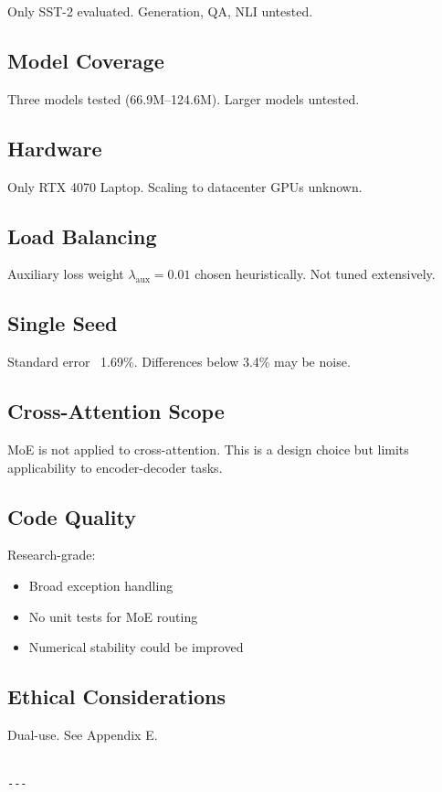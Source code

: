 Only SST-2 evaluated. Generation, QA, NLI untested.

\subsection{Model Coverage}

Three models tested (66.9M--124.6M). Larger models untested.

\subsection{Hardware}

Only RTX 4070 Laptop. Scaling to datacenter GPUs unknown.

\subsection{Load Balancing}

Auxiliary loss weight $\lambda_\text{aux} = 0.01$ chosen 
heuristically. Not tuned extensively.

\subsection{Single Seed}

Standard error ~1.69\%. Differences below 3.4\% may be noise.

\subsection{Cross-Attention Scope}

MoE is not applied to cross-attention. This is a design choice but 
limits applicability to encoder-decoder tasks.

\subsection{Code Quality}

Research-grade:
\begin{itemize}
\item Broad exception handling
\item No unit tests for MoE routing
\item Numerical stability could be improved

\end{itemize}
\subsection{Ethical Considerations}

Dual-use. See Appendix E.
\begin{lstlisting}

---
\end{lstlisting}